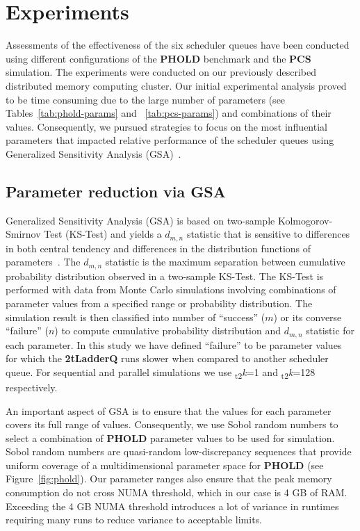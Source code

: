 \chapter{Experiments}\label{sec:experiments}

Assessments of the effectiveness of the six scheduler queues  have been conducted using different configurations of the \textbf{PHOLD} benchmark and the \textbf{PCS} simulation. The experiments were conducted on our previously described distributed memory computing cluster. Our initial experimental analysis proved to be time consuming due to the large number of parameters (see Tables~\ref{tab:phold-params} and ~\ref{tab:pcs-params}) and combinations of their values. Consequently, we pursued strategies to focus on the most influential parameters that impacted relative performance of the scheduler queues using Generalized Sensitivity Analysis (GSA)~\cite{guven-07}. 

\section{Parameter reduction via GSA}\label{sec:gsa}

Generalized Sensitivity Analysis (GSA) is based on two-sample Kolmogorov-Smirnov Test (KS-Test) and yields a $d_{m,n}$ statistic
that is sensitive to differences in both central tendency and differences in the distribution functions of
parameters~\cite{guven-07}. The $d_{m,n}$ statistic is the maximum separation between cumulative probability distribution observed in a
two-sample KS-Test. The KS-Test is performed with data from Monte Carlo simulations involving combinations of parameter values from a
specified range or probability distribution. The simulation result is then classified into number of ``success'' ($m$) or its converse
``failure'' ($n$) to compute cumulative probability distribution and $d_{m,n}$ statistic for each parameter. In this study we have defined
``failure'' to be parameter values for which the \textbf{2tLadderQ} runs slower when compared to another scheduler queue. For sequential and parallel simulations we use \textsubscript{t2}\textit{k}=1 and \textsubscript{t2}\textit{k}=128 respectively.

An important aspect of GSA is to ensure that the values for each parameter covers its full range of values. Consequently, we use Sobol
random numbers to select a combination of \textbf{PHOLD} parameter values to be used for simulation. Sobol random numbers are quasi-random
low-discrepancy sequences that provide uniform coverage of a multidimensional parameter space for \textbf{PHOLD} (see Figure~\ref{fig:phold}). Our parameter ranges also ensure that the peak memory consumption do not cross NUMA threshold, which in our case is 4 GB of RAM. Exceeding the 4 GB NUMA threshold introduces a lot of variance in runtimes requiring many runs to reduce variance to acceptable limits.


